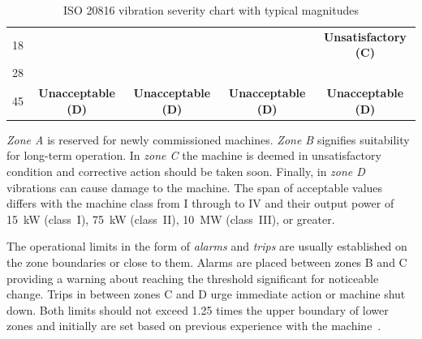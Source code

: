 \begin{table}[h]
\begin{adjustbox}{width=\columnwidth,center}
\begin{tabular}{|c|c|c|c|c|}
18                                                                                   & \cellcolor[HTML]{FD6864}                                                  & \cellcolor[HTML]{FD6864}                                                    & \cellcolor[HTML]{FD6864}                                                                     & \multirow{-2}{*}{\cellcolor[HTML]{F8A102}\textbf{Unsatisfactory (C)}}                         \\ \cline{1-1} \cline{5-5}
28                                                                                   & \cellcolor[HTML]{FD6864}                                                  & \cellcolor[HTML]{FD6864}                                                    & \cellcolor[HTML]{FD6864}                                                                     & \cellcolor[HTML]{FD6864}                                                                      \\ \cline{1-1}
45                                                                                   & \multirow{-5}{*}{\cellcolor[HTML]{FD6864}\textbf{Unacceptable (D)}}       & \multirow{-4}{*}{\cellcolor[HTML]{FD6864}\textbf{Unacceptable (D)}}         & \multirow{-3}{*}{\cellcolor[HTML]{FD6864}\textbf{Unacceptable (D)}}                          & \multirow{-2}{*}{\cellcolor[HTML]{FD6864}\textbf{Unacceptable (D)}}                           \\ \hline
\end{tabular}
\end{adjustbox}
\caption{ISO 20816 vibration severity chart with typical magnitudes \cite{noauthor_iso_2016}}
\label{tab:iso20816-vibration-severity}
\end{table}

\emph{Zone A} is reserved for newly commissioned machines. \emph{Zone B} signifies suitability for long-term operation. In \emph{zone C} the machine is deemed in unsatisfactory condition and corrective action should be taken soon. Finally, in \emph{zone D} vibrations can cause damage to the machine. The span of acceptable values differs with the machine class from I through to IV and their output power of 15~kW (class~I), 75~kW (class~II), 10~MW (class~III), or greater.

The operational limits in the form of \emph{alarms} and \emph{trips} are usually established on the zone boundaries or close to them. Alarms are placed between zones B and C providing a warning about reaching the threshold significant for noticeable change. Trips in between zones C and D urge immediate action or machine shut down. Both limits should not exceed 1.25 times the upper boundary of lower zones and initially are set based on previous experience with the machine~\cite{noauthor_iso_2002}.

